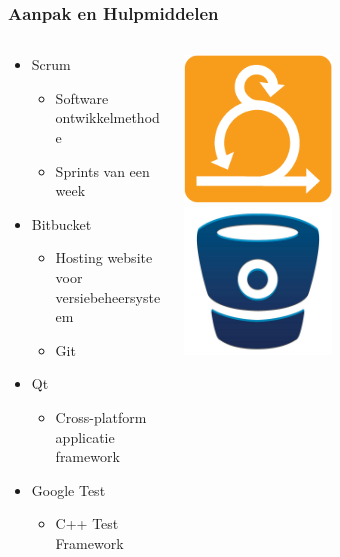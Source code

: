 \begin{frame}\frametitle{Aanpak en Hulpmiddelen}
	\begin{columns}[T]
  		\begin{column}{.7\textwidth}
			\begin{itemize}
				\item Scrum
					\begin{itemize}
						\item Software ontwikkelmethode
						\item Sprints van een week
					\end{itemize}
				\item Bitbucket
					\begin{itemize}
						\item Hosting website voor versiebeheersysteem
						\item Git
					\end{itemize}
				\item Qt
					\begin{itemize}
						\item Cross-platform applicatie framework
					\end{itemize}
				\item Google Test
					\begin{itemize}
						\item C++ Test Framework
					\end{itemize}
			\end{itemize}
		\end{column}
		\begin{column}{.3\textwidth}
			\includegraphics[width=0.45\textwidth]{images/scrum.png}\\
			\vspace{7mm}
			\includegraphics[width=0.45\textwidth]{images/bitbucket.jpg}\\

\end{column}
\end{columns}
\end{frame}
